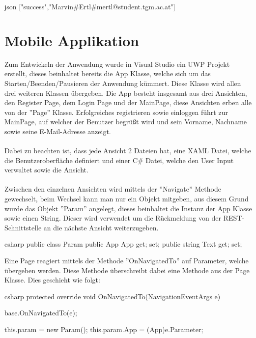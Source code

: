 \begin{code}{json}
	["success","Marvin#Ertl#mertl@student.tgm.ac.at"]
\end{code}

\section{Mobile Applikation}

Zum Entwickeln der Anwendung wurde in Visual Studio ein UWP Projekt erstellt, dieses beinhaltet bereits die App Klasse, welche sich um das Starten/Beenden/Pausieren der Anwendung kümmert. Diese Klasse wird allen drei weiteren Klassen übergeben. Die App besteht insgesamt aus drei Ansichten, den Register Page, dem Login Page und der MainPage, diese Ansichten erben alle von der ''Page'' Klasse. Erfolgreiches registrieren sowie einloggen führt zur MainPage, auf welcher der Benutzer begrüßt wird und sein Vorname, Nachname sowie seine E-Mail-Adresse anzeigt. \cite{uwptutorial}
\\\\
Dabei zu beachten ist, dass jede Ansicht 2 Dateien hat, eine XAML Datei, welche die Benutzeroberfläche definiert und einer C\# Datei, welche den User Input verwaltet sowie die Ansicht.
\\\\
Zwischen den einzelnen Ansichten wird mittels der ''Navigate'' Methode gewechselt, beim Wechsel kann man nur ein Objekt mitgeben, aus diesem Grund wurde das Objekt ''Param'' angelegt, dieses beinhaltet die Instanz der App Klasse sowie einen String. Dieser wird verwendet um die Rückmeldung von der REST-Schnittstelle an die nächste Ansicht weiterzugeben.

\begin{code}{csharp}
	public class Param
	{
		public App App { get; set; }
		public string Text { get; set; }
	}
\end{code}

Eine Page reagiert mittels der Methode ''OnNavigatedTo'' auf Parameter, welche übergeben werden. Diese Methode überschreibt dabei eine Methode aus der Page Klasse. Dies geschieht wie folgt:

\begin{code}{csharp}
protected override void OnNavigatedTo(NavigationEventArgs e)
{
	base.OnNavigatedTo(e);
	
	this.param = new Param();
	this.param.App = (App)e.Parameter;
	
}
\end{code}

